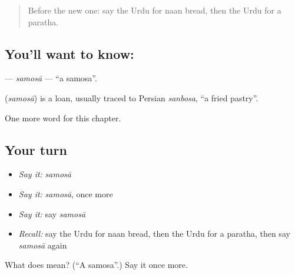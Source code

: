 \begin{quote}
Before the new one: say the Urdu for naan bread, then the Urdu for a paratha.
\end{quote}

\subsection*{You'll want to know: }
\textbf{} — \emph{samosā} — \textquotedblleft{}a samosa\textquotedblright{}.

\begin{cousinweb}
\textbf{} (\emph{samosā}) is a loan, usually traced to Persian \emph{sanbosa}, \textquotedblleft{}a fried pastry\textquotedblright{}.
\end{cousinweb}

\begin{grammarlens}[title={What you've built}]
One more word for this chapter.
\end{grammarlens}

\subsection*{Your turn}
\begin{itemize}
\raggedright
  \item \emph{Say it:} \emph{samosā}
  \item \emph{Say it:} \emph{samosā}, once more
  \item \emph{Say it:} say \emph{samosā}
  \item \emph{Recall:} say the Urdu for naan bread, then the Urdu for a paratha, then say \emph{samosā} again
\end{itemize}

\begin{tcolorbox}[breakable,colback=teal!4,colframe=teal!35!black,title={Before you move on}]
What does  mean? (\textquotedblleft{}A samosa\textquotedblright{}.) Say it once more.
\end{tcolorbox}
